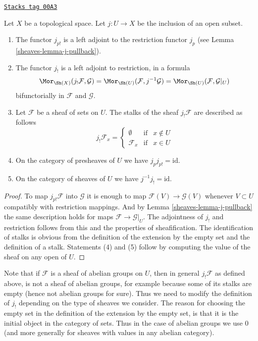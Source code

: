 \begin{lemma}[J shriek]
\label{sheaves-lemma-j-shriek}
\href{https://stacks.math.columbia.edu/tag/00A3}{\texttt{Stacks tag 00A3}}

Let $X$ be a topological space.
Let $j : U \to X$ be the inclusion of an open subset.
\begin{enumerate}
\item The functor $j_{p!}$ is a left adjoint to the
restriction functor $j_p$ (see Lemma \ref{sheaves-lemma-j-pullback}).
\item The functor $j_!$ is a left adjoint to restriction,
in a formula
$$
\Mor_{\Sh(X)}(j_!\mathcal{F}, \mathcal{G})
=
\Mor_{\Sh(U)}(\mathcal{F}, j^{-1}\mathcal{G})
=
\Mor_{\Sh(U)}(\mathcal{F}, \mathcal{G}|_U)
$$
bifunctorially in $\mathcal{F}$ and $\mathcal{G}$.
\item Let $\mathcal{F}$ be a sheaf of sets on $U$.
The stalks of the sheaf $j_!\mathcal{F}$ are described
as follows
$$
j_{!}\mathcal{F}_x =
\left\{
\begin{matrix}
\emptyset & \text{if} & x \not \in U \\
\mathcal{F}_x & \text{if} & x \in U
\end{matrix}
\right.
$$
\item On the category of presheaves of $U$ we have $j_pj_{p!} = \text{id}$.
\item On the category of sheaves of $U$ we have $j^{-1}j_! = \text{id}$.
\end{enumerate}
\end{lemma}

\begin{proof}

To map $j_{p!}\mathcal{F}$ into $\mathcal{G}$
it is enough to map $\mathcal{F}(V) \to \mathcal{G}(V)$
whenever $V \subset U$ compatibly with restriction
mappings. And by Lemma \ref{sheaves-lemma-j-pullback}
the same description holds for maps
$\mathcal{F} \to \mathcal{G}|_U$.
The adjointness of $j_!$ and restriction follows
from this and the properties of sheafification.
The identification of stalks is obvious from the
definition of the extension by the empty set
and the definition of a stalk.
Statements (4) and (5) follow by computing the
value of the sheaf on any open of $U$.
\end{proof}

Note that if $\mathcal{F}$ is a sheaf
of abelian groups on $U$, then in general $j_!\mathcal{F}$ as
defined above, is not a sheaf of abelian groups, for example
because some of its stalks are empty (hence not abelian groups
for sure). Thus we need to modify the definition of
$j_!$ depending on the type of sheaves we consider.
The reason for choosing the empty set in the definition of the
extension by the empty set, is that it is the initial object
in the category of sets. Thus in the case of abelian groups
we use $0$ (and more generally for sheaves with values in
any abelian category).

